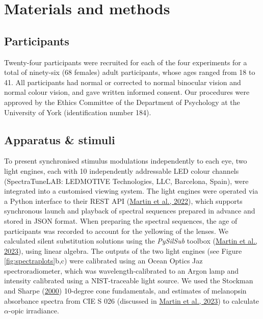 \documentclass[
]{article}
\begin{document}
\hypertarget{materials-and-methods}{%
\section{Materials and methods}\label{materials-and-methods}}

\hypertarget{participants}{%
\subsection{Participants}\label{participants}}

Twenty-four participants were recruited for each of the four experiments for a total of ninety-six (68 females) adult participants, whose ages ranged from 18 to 41. All participants had normal or corrected to normal binocular vision and normal colour vision, and gave written informed consent. Our procedures were approved by the Ethics Committee of the Department of Psychology at the University of York (identification number 184).

\hypertarget{apparatus-stimuli}{%
\subsection{Apparatus \& stimuli}\label{apparatus-stimuli}}

To present synchronised stimulus modulations independently to each eye, two light engines, each with 10 independently addressable LED colour channels (SpectraTuneLAB: LEDMOTIVE Technologies, LLC, Barcelona, Spain), were integrated into a customised viewing system. The light engines were operated via a Python interface to their REST API (\protect\hyperlink{ref-Martin2022}{Martin et al., 2022}), which supports synchronous launch and playback of spectral sequences prepared in advance and stored in JSON format. When preparing the spectral sequences, the age of participants was recorded to account for the yellowing of the lenses. We calculated silent substitution solutions using the \emph{PySilSub} toolbox (\protect\hyperlink{ref-Martin2023}{Martin et al., 2023}), using linear algebra. The outputs of the two light engines (see Figure \ref{fig:spectraplots}b,c) were calibrated using an Ocean Optics Jaz spectroradiometer, which was wavelength-calibrated to an Argon lamp and intensity calibrated using a NIST-traceable light source. We used the Stockman and Sharpe (\protect\hyperlink{ref-Stockman2000}{2000}) 10-degree cone fundamentals, and estimates of melanopsin absorbance spectra from CIE S 026 (discussed in \protect\hyperlink{ref-Martin2023}{Martin et al., 2023}) to calculate \(\alpha\)-opic irradiance.
\end{document}
